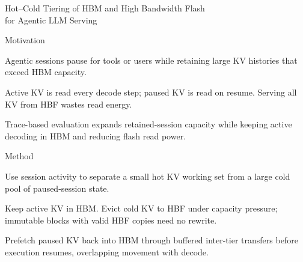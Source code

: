 \begin{frame}[t]{Hot--Cold Tiering of HBM and High Bandwidth Flash\\for Agentic LLM Serving}
\vspace{.02cm}
\begin{minipage}[t][3.25cm][t]{\linewidth}
\begin{summarysection}{Motivation}
\item {} Agentic sessions pause for tools or users while retaining large KV histories that exceed HBM capacity.
\item {} Active KV is read every decode step; paused KV is read on resume. Serving all KV from HBF wastes read energy.
\item {} Trace-based evaluation expands retained-session capacity while keeping active decoding in HBM and reducing flash read power.
\end{summarysection}
\end{minipage}
\vspace{.18cm}
\begin{summarysection}{Method}
\item {} Use session activity to separate a small hot KV working set from a large cold pool of paused-session state.
\item {} Keep active KV in HBM. Evict cold KV to HBF under capacity pressure; immutable blocks with valid HBF copies need no rewrite.
\item {} Prefetch paused KV back into HBM through buffered inter-tier transfers before execution resumes, overlapping movement with decode.
\end{summarysection}
\end{frame}
